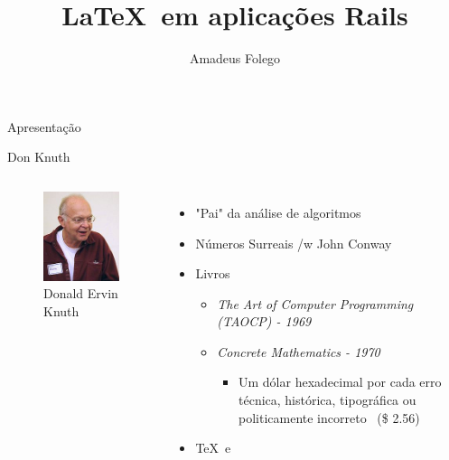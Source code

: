 \documentclass{beamer}
\author{Amadeus Folego}
\title{\LaTeX\ em aplicações Rails}
\date{}
\institute{
  \begin{tabular}{c c}        
    {\em www} & \url{http://badosu.com}\\
    {\em email} & \url{amadeusfolego@gmail.com}
  \end{tabular}
}
\begin{document}
  \begin{frame}[plain] 
    \titlepage
  \end{frame}
  \begin{frame}{Apresentação}
  \end{frame}
  \begin{frame}{Don Knuth}
    \begin{columns}[c]
        \begin{figure}[t]
          \includegraphics[width=\columnwidth]{192px-KnuthAtOpenContentAlliance}
          \caption*{\scriptsize Donald Ervin Knuth}
        \end{figure}
        \begin{itemize}
          \item "Pai" da análise de algoritmos \pause
          \item Números Surreais /w John Conway \pause
          \item Livros \pause
            \begin{itemize}
              \item {\em The Art of Computer Programming (TAOCP) - 1969} \pause
              \item {\em Concrete Mathematics - 1970} \pause 
              \begin{itemize}
                \item {\scriptsize Um dólar hexadecimal por cada erro técnica, histórica, tipográfica ou politicamente incorreto \ (\$ 2.56)} \pause 
              \end{itemize}
            \end{itemize}
          \item \TeX\ e \MF
        \end{itemize}
    \end{columns}
  \end{frame}
\end{document}

